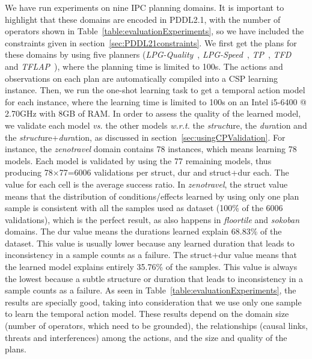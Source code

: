 \documentclass{ecai}
\begin{document}
We have run experiments on nine IPC planning domains. It is important to highlight that these domains are encoded in PDDL2.1, with the number of operators shown in Table~\ref{table:evaluationExperiments}, so we have included the constraints given in section~\ref{sec:PDDL21constraints}. We first get the plans for these domains by using five planners (\textit{LPG-Quality}~\cite{gerevini2003planning}, \textit{LPG-Speed}~\cite{gerevini2003planning}, \textit{TP}~\cite{jimenez2015temporal}, \textit{TFD}~\cite{eyerich2009using} and \textit{TFLAP}~\cite{marzal2016temporal}), where the planning time is limited to 100s.
The actions and observations on each plan are automatically compiled into a CSP learning instance. Then,
we run the one-shot learning task to get a temporal action model for each instance, where the learning time is limited to 100s on an Intel i5-6400 @ 2.70GHz with 8GB of RAM.
In order to assess the quality of the learned model, we validate each model \emph{vs.} the other models \emph{w.r.t.} the \emph{struct}ure, the \emph{dur}ation and the \emph{struct}ure+\emph{dur}ation, as discussed in section~\ref{sec:usingCPValidation}.
For instance, the \emph{zenotravel} domain contains 78 instances, which means learning 78 models. Each model is validated by using the 77 remaining models, thus producing 78$\times$77=6006 validations per struct, dur and struct+dur each. The value for each cell is the average success ratio.
In \emph{zenotravel}, the struct value means that the distribution of conditions/effects learned by using only one plan sample is consistent with all the samples used as dataset (100\% of the 6006 validations), which is the perfect result, as also happens in \emph{floortile} and \emph{sokoban} domains.
The dur value means the durations learned explain 68.83\% of the dataset. This value is usually lower because any learned duration that leads to inconsistency in a sample counts as a failure. The struct+dur value means that the learned model explains entirely 35.76\% of the samples. This value is always the lowest because a subtle structure or duration that leads to inconsistency in a sample counts as a failure.
As seen in Table~\ref{table:evaluationExperiments}, the results are specially good, taking into consideration that we use only one sample to learn the temporal action model.
These results depend on the domain size (number of operators, which need to be grounded), the relationships (causal links, threats and interferences) among the actions, and the size and quality of the plans.
\end{document}
